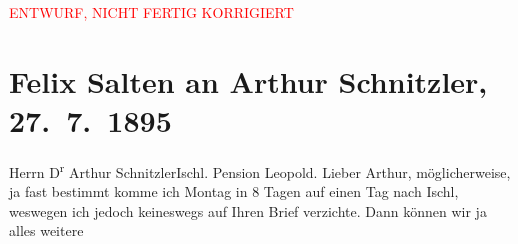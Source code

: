 
\begin{center}
            \textcolor{red}{ENTWURF, NICHT FERTIG KORRIGIERT}
                      \end{center}
            
         
         \renewcommand{\erwaehntePersonen}{Personen: Peter Altenberg}
         \renewcommand{\erwaehnteOrte}{Orte: Bad Ischl, Gmunden, Goldener Brunnen, Hotel und Pension Rudolfshöhe (Leopold Petter), IX., Alsergrund, Wien}
         \renewcommand{\erwaehnteWerke}{Werke: Die Münchener Kunstausstellungen. I. Im königl. Glaspalast, Die Münchener Kunstausstellungen. II. Im königl. Glaspalast, Münchener Brief. (Orig.-Corr. der »Wiener Allg. Ztg.«)}
               \section[Felix Salten an Arthur Schnitzler, 27. 7. 1895]{ Felix Salten an Arthur Schnitzler, 27. 7. 1895}\nopagebreak{}\rehead{ }\begin{ledgroupsized}[t]{13cm}\normalsize\beginnumbering \toendnotes[C]{\smallbreak\pagebreak[2]} 
\toendnotes[C]{\smallbreak}\pstart{}{\pb}Herrn D\textsuperscript{r} Arthur Schnitzler\pend{}\pstart{}Ischl. \pend{}\pstart{}Pension Leopold.\pend{}{\bigskip}\pstart
           \noindent{}{\pb}Lieber Arthur, möglicherweise, ja fast bestimmt komme ich Montag in
               8 Tagen auf einen Tag nach Ischl, weswegen ich
               jedoch keineswegs auf Ihren Brief verzichte. Dann können wir ja alles weitere

\end{ledgroupsized}
